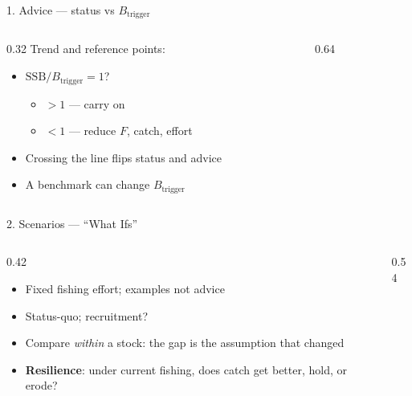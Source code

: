 \documentclass[12pt,aspectratio=169]{beamer}
\begin{document}
\begin{frame}{1. Advice --- status vs $B_{\mathrm{trigger}}$}
  \begin{columns}[T]
    \begin{column}{0.32\textwidth}
      \footnotesize
      Trend and reference points:
      \vspace{1mm}
      \begin{itemize}
        \item $\mathrm{SSB}/B_{\mathrm{trigger}}=1$?
        \begin{itemize}
          \item \textcolor{bimcarry}{$> 1$ --- carry on}
          \item \textcolor{bimreduce}{$<{ }1$ --- reduce $F$, catch, effort}
        \end{itemize}
        \item Crossing the line flips status and advice
        \item A benchmark can change $B_{\mathrm{trigger}}$
      \end{itemize}
    \end{column}
    \begin{column}{0.64\textwidth}
      \centering
      \\
    \end{column}
  \end{columns}
\end{frame}

\begin{frame}{2. Scenarios --- ``What Ifs''}
  \begin{columns}[T]
    \begin{column}{0.42\textwidth}
      \footnotesize
      \begin{itemize}
        \item Fixed fishing effort; examples not advice
        \item Status-quo; recruitment?
        \item Compare \emph{within} a stock: the gap is the assumption that changed
        \item \textbf{Resilience}: under current fishing, does catch get better, hold, or erode?
      \end{itemize}
    \end{column}
    \begin{column}{0.54\textwidth}
      \centering
      \\
    \end{column}
  \end{columns}
\end{frame}
\end{document}
